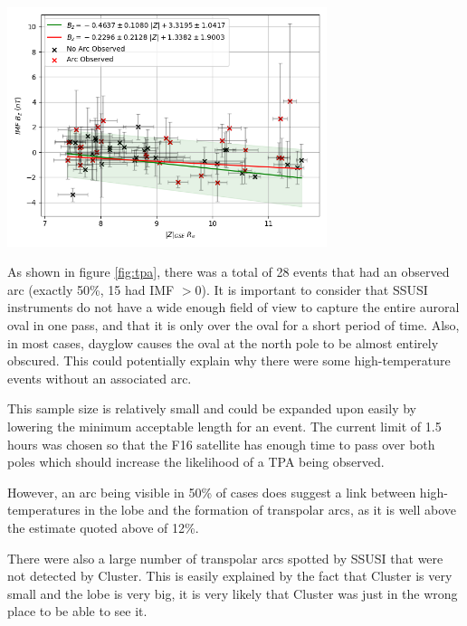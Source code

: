 \documentclass[12pt]{article}
\newenvironment{Figure}
  {\par\medskip\noindent\minipage{\linewidth}}
  {\endminipage\par\medskip}
\begin{document}
\begin{Figure}
    \centering
    \includegraphics[width=0.7\textwidth]{tpa.png}
    \label{fig:tpa}
\end{Figure}

As shown in figure \ref{fig:tpa}, there was a total of 28 events that had an observed arc (exactly 50\%, 15 had IMF $> 0$). It is important to consider that SSUSI instruments do not have a wide enough field of view to capture the entire auroral oval in one pass, and that it is only over the oval for a short period of time. Also, in most cases, dayglow causes the oval at the north pole to be almost entirely obscured. This could potentially explain why there were some high-temperature events without an associated arc.

This sample size is relatively small and could be expanded upon easily by lowering the minimum acceptable length for an event. The current limit of 1.5 hours was chosen so that the F16 satellite has enough time to pass over both poles which should increase the likelihood of a TPA being observed.

However, an arc being visible in 50\% of cases does suggest a link between high-temperatures in the lobe and the formation of transpolar arcs, as it is well above the estimate quoted above of 12\%. 

There were also a large number of transpolar arcs spotted by SSUSI that were not detected by Cluster. This is easily explained by the fact that Cluster is very small and the lobe is very big, it is very likely that Cluster was just in the wrong place to be able to see it.
\end{document}
